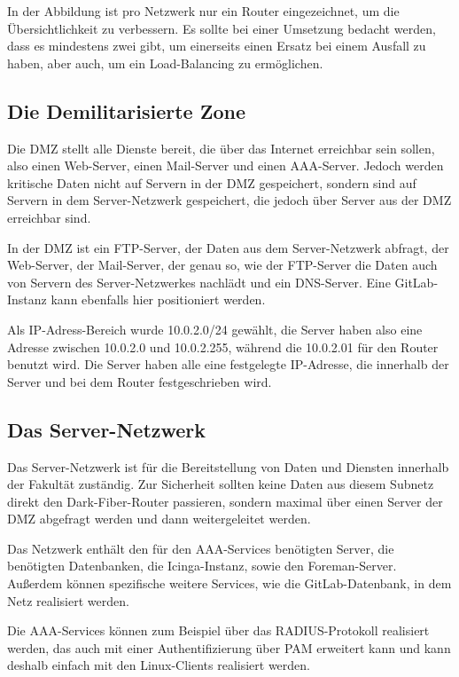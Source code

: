 In der Abbildung ist pro Netzwerk nur ein Router eingezeichnet, um die Übersichtlichkeit zu verbessern. Es sollte bei einer Umsetzung bedacht werden, dass es mindestens zwei gibt, um einerseits einen Ersatz bei einem Ausfall zu haben, aber auch, um  ein Load-Balancing zu ermöglichen.

\subsection{Die Demilitarisierte Zone}
Die DMZ stellt alle Dienste bereit, die über das Internet erreichbar sein sollen, also einen Web-Server, einen Mail-Server und einen AAA-Server. Jedoch werden kritische Daten nicht auf Servern in der DMZ gespeichert, sondern sind auf Servern in dem Server-Netzwerk gespeichert, die jedoch über Server aus der DMZ erreichbar sind.

In der DMZ ist ein FTP-Server, der Daten aus dem Server-Netzwerk abfragt, der Web-Server, der Mail-Server, der genau so, wie der FTP-Server die Daten auch von Servern des Server-Netzwerkes nachlädt und ein DNS-Server. Eine GitLab-Instanz kann ebenfalls hier positioniert werden.

Als IP-Adress-Bereich wurde 10.0.2.0/24 gewählt, die Server haben also eine Adresse zwischen 10.0.2.0 und 10.0.2.255, während die 10.0.2.01 für den Router benutzt wird. Die Server haben alle eine festgelegte IP-Adresse, die innerhalb der Server und bei dem Router festgeschrieben wird.


\subsection{Das Server-Netzwerk}
Das Server-Netzwerk ist für die Bereitstellung von Daten und Diensten innerhalb der Fakultät zuständig. Zur Sicherheit sollten keine Daten aus diesem Subnetz direkt den Dark-Fiber-Router passieren, sondern maximal über einen Server der DMZ abgefragt werden und dann weitergeleitet werden.

Das Netzwerk enthält den für den AAA-Services benötigten Server, die benötigten Datenbanken, die Icinga-Instanz, sowie den Foreman-Server. Außerdem können spezifische weitere Services, wie die GitLab-Datenbank, in dem Netz realisiert werden.

Die AAA-Services können zum Beispiel über das RADIUS-Protokoll realisiert werden, das auch mit einer Authentifizierung über PAM erweitert kann und kann deshalb einfach mit den Linux-Clients realisiert werden.

